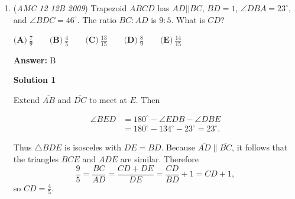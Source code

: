 \begin{enumerate}
 We now get the following easier problem: Given that $0<r<3$, find the smallest value in the set $\{ 1+r, 1+r/10, 1+2r, 1+\sqrt r, 1+1/r\}$.

 Clearly $1+r/10$ is smaller than the first and the third option. 

 We have $r^2 < 10$, dividing both sides by $10r$ we get $r/10 < 1/r$. 

 And finally, $r/100 < 1$, therefore $r^2/100 < r$, and as both sides are positive, we can take the square root and get $r/10 < \sqrt r$.

 Thus the answer is $\boxed{\textbf{(B) } 3\left(1+\frac{r}{10}\right)^x = 7}$.

 



\textbf{Solution 2}

As stated in the first solution, $x$ will be largest when the value in the parenthesis is smallest.

 We can plug in a value for $r$ (for instance, $r=2$) and see which parenthesis has the smallest value. Doing so, we see that B is the answer.

 -Made\_in\_2004

 


	\item (\textit{AMC 12 12B 2009}) Trapezoid $ABCD$ has $AD||BC$, $BD = 1$, $\angle DBA = 23^{\circ}$, and $\angle BDC = 46^{\circ}$.  The ratio $BC: AD$ is $9: 5$.  What is $CD$?


 $\textbf{(A)}\ \frac {7}{9}\qquad \textbf{(B)}\ \frac {4}{5}\qquad \textbf{(C)}\ \frac {13}{15} \qquad \textbf{(D)}\ \frac {8}{9}\qquad \textbf{(E)}\ \frac {14}{15}$

 \textbf{Answer: }B



\textbf{Solution 1}

Extend $\overline {AB}$ and $\overline {DC}$ to meet at $E$.  Then

 
 \begin{align*} \angle BED &= 180^{\circ} - \angle EDB - \angle DBE\\ &= 180^{\circ} - 134^{\circ} -23^{\circ} = 23^{\circ}. \end{align*}


 Thus $\triangle BDE$ is isosceles with $DE = BD$.  Because $\overline {AD} \parallel \overline {BC}$, it follows that the triangles $BCE$ and $ADE$ are similar.  Therefore
 \[\frac 95 = \frac {BC}{AD} = \frac {CD + DE}{DE} = \frac {CD}{BD} + 1 = CD + 1,\]so $CD = \boxed{\frac 45}.$




\end{enumerate}
